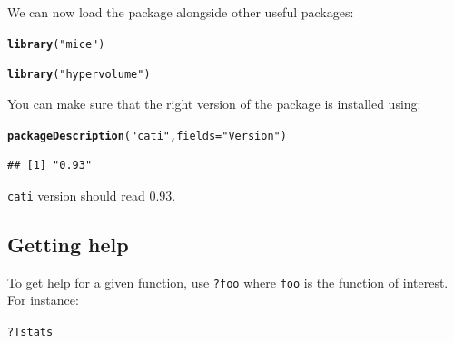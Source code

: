 \documentclass[12pt]{article}\usepackage[]{graphicx}\usepackage[]{color}
\makeatletter
\newcommand{\hlstr}[1]{\textcolor[rgb]{0.192,0.494,0.8}{#1}}%
\newcommand{\hlopt}[1]{\textcolor[rgb]{0,0,0}{#1}}%
\newcommand{\hlstd}[1]{\textcolor[rgb]{0.345,0.345,0.345}{#1}}%
\newcommand{\hlkwc}[1]{\textcolor[rgb]{0.333,0.667,0.333}{#1}}%
\newcommand{\hlkwd}[1]{\textcolor[rgb]{0.737,0.353,0.396}{\textbf{#1}}}%
\newenvironment{kframe}{%
 \def\at@end@of@kframe{}%
 \ifinner\ifhmode%
  \def\at@end@of@kframe{\end{minipage}}%
  \begin{minipage}{\columnwidth}%
 \fi\fi%
 \def\FrameCommand##1{\hskip\@totalleftmargin \hskip-\fboxsep
 \colorbox{shadecolor}{##1}\hskip-\fboxsep
     \hskip-\linewidth \hskip-\@totalleftmargin \hskip\columnwidth}%
 \MakeFramed {\advance\hsize-\width
   \@totalleftmargin\z@ \linewidth\hsize
   \@setminipage}}%
 {\par\unskip\endMakeFramed%
 \at@end@of@kframe}
\newenvironment{knitrout}{}{} %
\makeatother
\begin{document}
We can now load the package alongside other useful packages:
\begin{knitrout}
\color{fgcolor}\begin{kframe}
\begin{alltt}
\hlkwd{library}\hlstd{(}\hlstr{"mice"}\hlstd{)}
\end{alltt}


{\ttfamily\noindent\itshape\color{messagecolor}{\#\# Loading required package: Rcpp\\\#\# Loading required package: lattice\\\#\# mice 2.22 2014-06-10}}\begin{alltt}
\hlkwd{library}\hlstd{(}\hlstr{"hypervolume"}\hlstd{)}
\end{alltt}


{\ttfamily\noindent\itshape\color{messagecolor}{\#\# Loading required package: rgl}}\end{kframe}
\end{knitrout}

\noindent You can make sure that the right version of the package is installed using:
\begin{knitrout}
\color{fgcolor}\begin{kframe}
\begin{alltt}
\hlkwd{packageDescription}\hlstd{(}\hlstr{"cati"}\hlstd{,} \hlkwc{fields} \hlstd{=} \hlstr{"Version"}\hlstd{)}
\end{alltt}
\begin{verbatim}
## [1] "0.93"
\end{verbatim}
\end{kframe}
\end{knitrout}
\texttt{cati} version should read 0.93.

\subsection{Getting help}

To get help for a given function, use \texttt{?foo} where \texttt{foo} is the
function of interest.
For instance:

\begin{knitrout}
\color{fgcolor}\begin{kframe}
\begin{alltt}
\hlopt{?}\hlstd{Tstats}
\end{alltt}
\end{kframe}
\end{knitrout}
\end{document}
